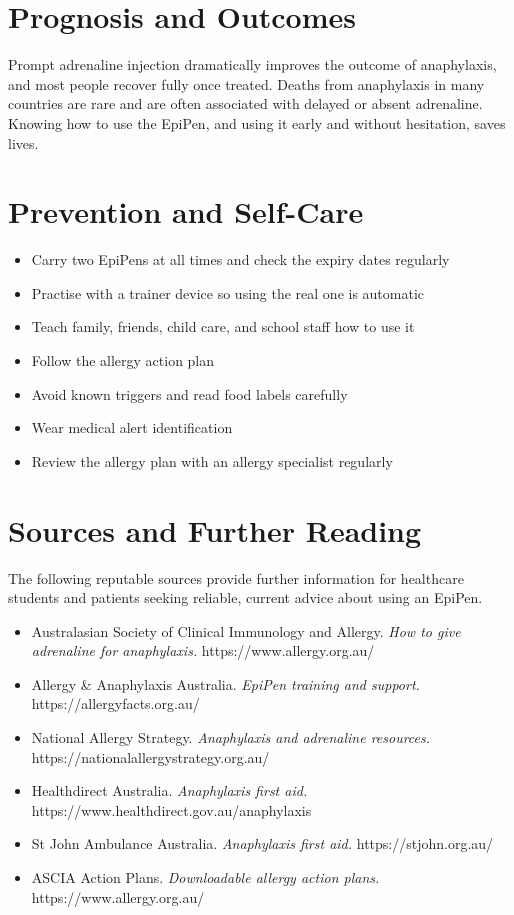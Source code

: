\section*{Prognosis and Outcomes}
Prompt adrenaline injection dramatically improves the outcome of anaphylaxis, and most people recover fully once treated. Deaths from anaphylaxis in many countries are rare and are often associated with delayed or absent adrenaline. Knowing how to use the EpiPen, and using it early and without hesitation, saves lives.

\section*{Prevention and Self-Care}
\begin{itemize}
    \item Carry two EpiPens at all times and check the expiry dates regularly
    \item Practise with a trainer device so using the real one is automatic
    \item Teach family, friends, child care, and school staff how to use it
    \item Follow the allergy action plan
    \item Avoid known triggers and read food labels carefully
    \item Wear medical alert identification
    \item Review the allergy plan with an allergy specialist regularly
\end{itemize}

\section*{Sources and Further Reading}
The following reputable sources provide further information for healthcare students and patients seeking reliable, current advice about using an EpiPen.
\begin{itemize}
    \item Australasian Society of Clinical Immunology and Allergy. \textit{How to give adrenaline for anaphylaxis.} https://www.allergy.org.au/
    \item Allergy \& Anaphylaxis Australia. \textit{EpiPen training and support.} https://allergyfacts.org.au/
    \item National Allergy Strategy. \textit{Anaphylaxis and adrenaline resources.} https://nationalallergystrategy.org.au/
    \item Healthdirect Australia. \textit{Anaphylaxis first aid.} https://www.healthdirect.gov.au/anaphylaxis
    \item St John Ambulance Australia. \textit{Anaphylaxis first aid.} https://stjohn.org.au/
    \item ASCIA Action Plans. \textit{Downloadable allergy action plans.} https://www.allergy.org.au/
\end{itemize}
